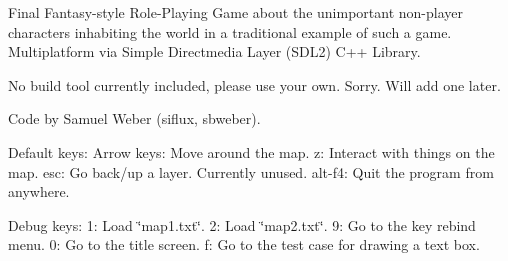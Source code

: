 Final Fantasy-\/style Role-\/\+Playing Game about the unimportant non-\/player characters inhabiting the world in a traditional example of such a game. Multiplatform via Simple Directmedia Layer (S\+D\+L2) C++ Library.

No build tool currently included, please use your own. Sorry. Will add one later.

Code by Samuel Weber (siflux, sbweber).

Default keys\+: Arrow keys\+: Move around the map. z\+: Interact with things on the map. esc\+: Go back/up a layer. Currently unused. alt-\/f4\+: Quit the program from anywhere.

Debug keys\+: 1\+: Load \char`\"{}map1.\+txt\char`\"{}. 2\+: Load \char`\"{}map2.\+txt\char`\"{}. 9\+: Go to the key rebind menu. 0\+: Go to the title screen. f\+: Go to the test case for drawing a text box. 
